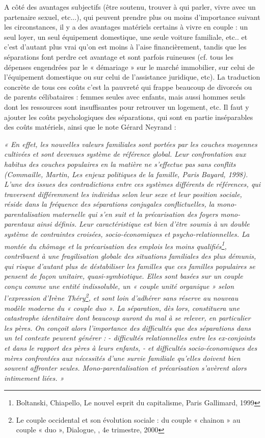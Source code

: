 A côté des avantages subjectifs (être soutenu, trouver à qui parler, vivre avec un partenaire sexuel, etc...), qui peuvent prendre plus ou moins d'importance suivant les circonstances, il y a des avantages matériels certains à vivre en couple : un seul loyer, un seul équipement domestique, une seule voiture familiale,  etc.. et c'est d'autant plus vrai qu'on est moins à l’aise financièrement, tandis que les séparations font perdre cet avantage et sont parfois ruineuses (cf. tous les dépenses engendrées par le « démariage » sur le marché immobilier, sur celui de l'équipement domestique ou sur celui de l'assistance juridique, etc). La traduction concrète de tous ces coûts c'est la pauvreté qui frappe beaucoup de divorcés ou de parents célibataires : femmes seules avec enfants, mais aussi hommes seuls dont les ressources sont insuffisantes pour retrouver un logement, etc. Il faut y ajouter les coûts psychologiques des séparations, qui sont en partie inséparables des coûts matériels, ainsi que le note Gérard Neyrand  :  
\begin{displayquote}
\emph{« En effet, les nouvelles valeurs familiales sont portées par les couches moyennes cultivées et sont devenues système de référence global. Leur confrontation aux habitus des couches populaires en la matière ne s'effectue pas sans conflits (Commaille, Martin, Les enjeux politiques de la famille, Paris Bayard, 1998). L'une des issues des contradictions entre ces systèmes différents de références, qui traversent différemment les individus selon leur sexe et leur position sociale, réside dans la fréquence des séparations conjugales conflictuelles, la mono-parentalisation maternelle qui s'en suit et la précarisation des foyers mono-parentaux ainsi définis. Leur caractéristique est bien d'être soumis à un double système de contraintes croisées, socio-économiques et psycho-relationnelles.
La montée du chômage et la précarisation des emplois les moins qualifiés\footnote{ Boltanski, Chiapello, Le nouvel esprit du capitalisme, Paris Gallimard, 1999}, contribuent à une fragilisation globale des situations familiales des plus démunis, qui risque d'autant plus de déstabiliser les familles que ces familles populaires se pensent de façon unitaire, quasi-symbiotique.
Elles sont basées sur un couple conçu comme une entité indissoluble, un « couple unité organique » selon l'expression d'Irène Théry\footnote{Le couple occidental et son évolution sociale : du couple « chainon » au couple « duo », Dialogue, , 4e trimestre, 2000}, et sont loin d'adhérer sans réserve au nouveau modèle moderne du « couple duo ». La séparation, dès lors, constituera une catastrophe identitaire dont beaucoup auront du mal à se relever, en particulier les pères.
On conçoit alors l'importance des difficultés que des séparations dans un tel contexte peuvent générer :
- difficultés relationnelles entre les ex-conjoints et dans le rapport des pères à leurs enfants,
- et difficultés socio-économiques des mères confrontées aux nécessités d'une survie familiale qu'elles doivent bien souvent affronter seules.
Mono-parentalisation et précarisation s'avèrent alors intimement liées. »}
\end{displayquote}


